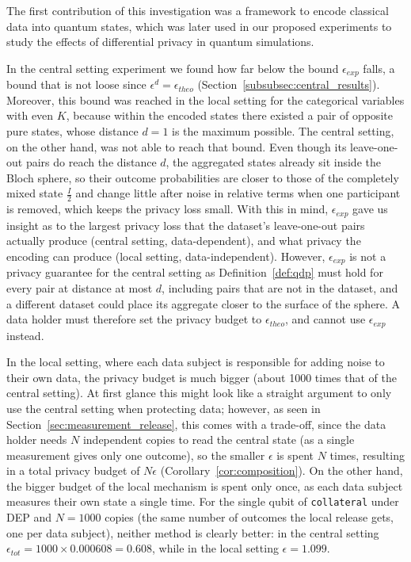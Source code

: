 \documentclass{ieeeaccess}
\begin{document}
The first contribution of this investigation was a framework to encode classical data into quantum states, which was later used in our proposed experiments to study the effects of differential privacy in quantum simulations.

In the central setting experiment we found how far below the bound $\epsilon_{exp}$ falls, a bound that is not loose since $\epsilon^{d} = \epsilon_{theo}$ (Section~\ref{subsubsec:central_results}). Moreover, this bound was reached in the local setting for the categorical variables with even $K$, because within the encoded states there existed a pair of opposite pure states, whose distance $d = 1$ is the maximum possible. The central setting, on the other hand, was not able to reach that bound. Even though its leave-one-out pairs do reach the distance $d$, the aggregated states already sit inside the Bloch sphere, so their outcome probabilities are closer to those of the completely mixed state $\frac{I}{2}$ and change little after noise in relative terms when one participant is removed, which keeps the privacy loss small. With this in mind, $\epsilon_{exp}$ gave us insight as to the largest privacy loss that the dataset's leave-one-out pairs actually produce (central setting, data-dependent), and what privacy the encoding can produce (local setting, data-independent). However, $\epsilon_{exp}$ is not a privacy guarantee for the central setting as Definition~\ref{def:qdp} must hold for every pair at distance at most $d$, including pairs that are not in the dataset, and a different dataset could place its aggregate closer to the surface of the sphere. A data holder must therefore set the privacy budget to $\epsilon_{theo}$, and cannot use $\epsilon_{exp}$ instead.

In the local setting, where each data subject is responsible for adding noise to their own data, the privacy budget is much bigger (about 1000 times that of the central setting). At first glance this might look like a straight argument to only use the central setting when protecting data; however, as seen in Section~\ref{sec:measurement_release}, this comes with a trade-off, since the data holder needs $N$ independent copies to read the central state (as a single measurement gives only one outcome), so the smaller $\epsilon$ is spent $N$ times, resulting in a total privacy budget of $N\epsilon$ (Corollary~\ref{cor:composition}). On the other hand, the bigger budget of the local mechanism is spent only once, as each data subject measures their own state a single time. For the single qubit of \texttt{collateral} under DEP and $N = 1000$ copies (the same number of outcomes the local release gets, one per data subject), neither method is clearly better: in the central setting $\epsilon_{tot} = 1000 \times 0.000608 = 0.608$, while in the local setting $\epsilon = 1.099$.
\end{document}
